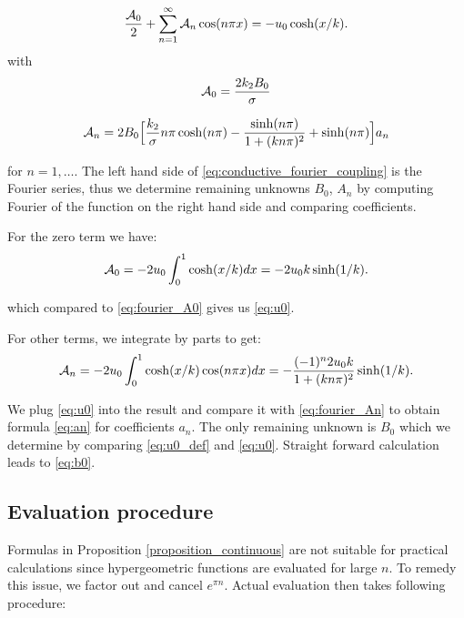 \documentclass{elsarticle}
\begin{document}
\begin{equation}
    \label{eq:conductive_fourier_coupling}
    \frac{{\cal A}_0}{2} + \sum^{\infty}_{n=1} {\cal A}_n \cos (n\pi x) =  - u_0 \cosh(x/k).
\end{equation}
with
\begin{equation}
    \label{eq:fourier_A0}
    {\cal A}_0 = \frac{2 k_2 B_0}{\sigma} 
\end{equation}


\begin{equation}
    \label{eq:fourier_An} 
        {\cal A}_n = 2B_0 \Bigl[ \frac{k_2}{\sigma} n\pi \cosh(n\pi) - \frac{\sinh(n \pi)}{1 + (k n \pi)^2}  
    + \sinh(n \pi) \Bigr]a_n
\end{equation}

for $n=1, \dots$. The left hand side of \eqref{eq:conductive_fourier_coupling} is the Fourier series, thus we determine
remaining unknowns $B_0$, $A_n$ by computing Fourier of the function on the right hand side and comparing coefficients.

For the zero term we have:
\begin{equation}
    \label{eq:compute_A0}
    {\cal A}_0 = -2 u_0 \int _0^1 \cosh(x/k) dx =
    - 2 u_0 k\sinh(1/k).
\end{equation}

which compared to \eqref{eq:fourier_A0} gives us \eqref{eq:u0}.


For other terms, we integrate by parts to get:
\begin{equation}
    \label{eq:compute_An}
    {\cal A}_n = -2 u_0\int _0^1 \cosh(x/k) \cos (n\pi x) dx 
    = -\frac{(-1)^n 2u_0 k}{1+(k n \pi)^2}\sinh(1/k).
\end{equation}


We plug \eqref{eq:u0} into the result and compare it with \eqref{eq:fourier_An} to obtain
formula \eqref{eq:an} for coefficients $a_n$.
The only remaining unknown is $B_0$ which we determine by comparing \eqref{eq:u0_def} and \eqref{eq:u0}.
Straight forward calculation leads to \eqref{eq:b0}.

\subsection{Evaluation procedure}
Formulas in Proposition \ref{proposition_continuous} are not suitable for practical calculations since hypergeometric functions are evaluated for large $n$.
To remedy this issue, we factor out and cancel $e^{\pi n}$. Actual evaluation then takes  following procedure:
\end{document}

